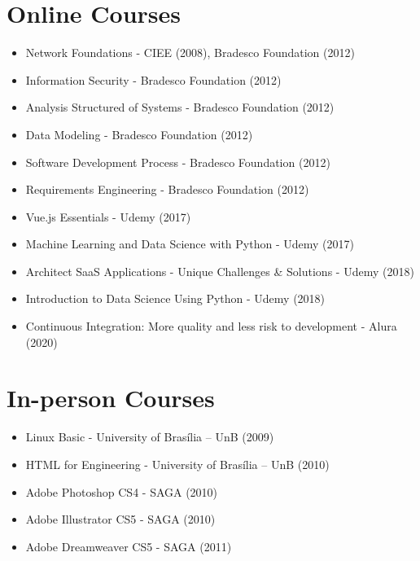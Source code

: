 \section{Online Courses}
\begin{itemize}
    \item Network Foundations - CIEE (2008), Bradesco Foundation (2012)
    \item Information Security - Bradesco Foundation (2012)
    \item Analysis Structured of Systems - Bradesco Foundation (2012)
    \item Data Modeling - Bradesco Foundation (2012)
    \item Software Development Process - Bradesco Foundation (2012)
    \item Requirements Engineering - Bradesco Foundation (2012)
    \item Vue.js Essentials - Udemy (2017)
    \item Machine Learning and Data Science with Python - Udemy (2017)
    \item Architect SaaS Applications - Unique Challenges & Solutions - Udemy (2018)
    \item Introduction to Data Science Using Python - Udemy (2018)
    \item Continuous Integration: More quality and less risk to development - Alura (2020)
\end{itemize}

\section{In-person Courses}
\begin{itemize}
    \item Linux Basic - University of Brasília – UnB (2009)
    \item HTML for Engineering - University of Brasília – UnB (2010)
    \item Adobe Photoshop CS4 - SAGA (2010)
    \item Adobe Illustrator CS5 - SAGA (2010)
    \item Adobe Dreamweaver CS5 - SAGA (2011)
\end{itemize}